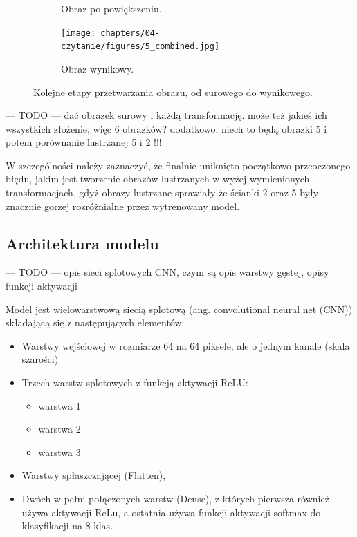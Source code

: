 \begin{figure}[H]
\begin{subfigure}[t]{0.32\linewidth}
        \caption{Obraz po powiększeniu.}
        \label{fig:5zoom}
    \end{subfigure}
    \hfill
    \begin{subfigure}[t]{0.32\linewidth}
        \centering
        \texttt{[image: chapters/04-czytanie/figures/5\_combined.jpg]}
        \caption{Obraz wynikowy.}
        \label{fig:5combined}
    \end{subfigure}

    \caption{Kolejne etapy przetwarzania obrazu, od surowego do wynikowego.}
    \label{fig:5processing}
\end{figure}

\fi

--- TODO --- dać obrazek surowy i każdą transformację. może też jakieś ich wszystkich złożenie, więc 6 obrazków?
dodatkowo, niech to będą obrazki 5 i potem porównanie lustrzanej 5 i 2 !!!


W szczególności należy zaznaczyć, że finalnie uniknięto początkowo przeoczonego błędu,
jakim jest tworzenie obrazów lustrzanych w wyżej wymienionych transformacjach, gdyż obrazy lustrzane
sprawiały że ścianki 2 oraz 5 były znacznie gorzej rozróżnialne przez wytrenowany model.

\subsection{Architektura modelu}\label{subsec:architektura-modelu}

--- TODO --- opis sieci splotowych CNN, czym są
opis warstwy gęstej, opisy funkcji aktywacji

Model jest wielowarstwową siecią splotową (ang. convolutional neural net (CNN))
składającą się z następujących elementów:

\begin{itemize}
    \item Warstwy wejściowej w rozmiarze 64 na 64 piksele, ale o jednym kanale (skala szarości)
    \item Trzech warstw splotowych z funkcją aktywacji ReLU:
    \begin{itemize}
        \item warstwa 1
        \item warstwa 2
        \item warstwa 3
    \end{itemize}
    \item Warstwy spłaszczającej (Flatten),
    \item Dwóch w pełni połączonych warstw (Dense), z których pierwsza również używa aktywacji ReLu,
a ostatnia używa funkcji aktywacji softmax do klasyfikacji na 8 klas.
\end{itemize}

